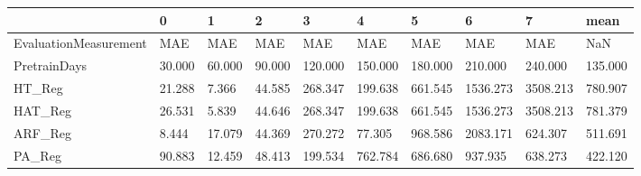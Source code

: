 \begin{tabular}{llllllllll}
\toprule
{} &      0 &      1 &      2 &       3 &       4 &       5 &        6 &        7 &    mean \\
\midrule
EvaluationMeasurement &    MAE &    MAE &    MAE &     MAE &     MAE &     MAE &      MAE &      MAE &     NaN \\
PretrainDays          & 30.000 & 60.000 & 90.000 & 120.000 & 150.000 & 180.000 &  210.000 &  240.000 & 135.000 \\
HT\_Reg                & 21.288 &  7.366 & 44.585 & 268.347 & 199.638 & 661.545 & 1536.273 & 3508.213 & 780.907 \\
HAT\_Reg               & 26.531 &  5.839 & 44.646 & 268.347 & 199.638 & 661.545 & 1536.273 & 3508.213 & 781.379 \\
ARF\_Reg               &  8.444 & 17.079 & 44.369 & 270.272 &  77.305 & 968.586 & 2083.171 &  624.307 & 511.691 \\
PA\_Reg                & 90.883 & 12.459 & 48.413 & 199.534 & 762.784 & 686.680 &  937.935 &  638.273 & 422.120 \\
\bottomrule
\end{tabular}
